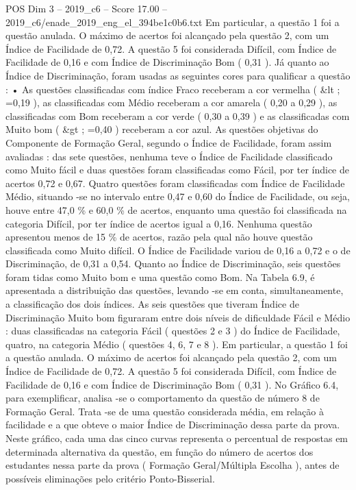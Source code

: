 \begin{textsample}{POS Dim 3 – 2019\_c6 – Score 17.00 – 2019\_c6/enade\_2019\_eng\_el\_394be1c0b6.txt}
Em particular, a questão 1 foi a questão anulada.
O máximo de acertos foi alcançado pela questão 2, com um Índice de Facilidade de 0,72.
A questão 5 foi considerada Difícil, com Índice de Facilidade de 0,16 e com Índice de Discriminação Bom ( 0,31 ).
Já quanto ao Índice de Discriminação, foram usadas as seguintes cores para qualificar a questão : • As questões classificadas com índice Fraco receberam a cor vermelha ( \&lt ; =0,19 ), as classificadas com Médio receberam a cor amarela ( 0,20 a 0,29 ), as classificadas com Bom receberam a cor verde ( 0,30 a 0,39 ) e as classificadas com Muito bom ( \&gt ; =0,40 ) receberam a cor azul.
As questões objetivas do Componente de Formação Geral, segundo o Índice de Facilidade, foram assim avaliadas : das sete questões, nenhuma teve o Índice de Facilidade classificado como Muito fácil e duas questões foram classificadas como Fácil, por ter índice de acertos 0,72 e 0,67.
Quatro questões foram classificadas com Índice de Facilidade Médio, situando -se no intervalo entre 0,47 e 0,60 do Índice de Facilidade, ou seja, houve entre 47,0 \% e 60,0 \% de acertos, enquanto uma questão foi classificada na categoria Difícil, por ter índice de acertos igual a 0,16.
Nenhuma questão apresentou menos de 15 \% de acertos, razão pela qual não houve questão classificada como Muito difícil.
O Índice de Facilidade variou de 0,16 a 0,72 e o de Discriminação, de 0,31 a 0,54.
Quanto ao Índice de Discriminação, seis questões foram tidas como Muito bom e uma questão como Bom.
Na Tabela 6.9, é apresentada a distribuição das questões, levando -se em conta, simultaneamente, a classificação dos dois índices.
As seis questões que tiveram Índice de Discriminação Muito bom figuraram entre dois níveis de dificuldade Fácil e Médio : duas classificadas na categoria Fácil ( questões 2 e 3 ) do Índice de Facilidade, quatro, na categoria Médio ( questões 4, 6, 7 e 8 ).
Em particular, a questão 1 foi a questão anulada.
O máximo de acertos foi alcançado pela questão 2, com um Índice de Facilidade de 0,72.
A questão 5 foi considerada Difícil, com Índice de Facilidade de 0,16 e com Índice de Discriminação Bom ( 0,31 ).
No Gráfico 6.4, para exemplificar, analisa -se o comportamento da questão de número 8 de Formação Geral.
Trata -se de uma questão considerada média, em relação à facilidade e a que obteve o maior Índice de Discriminação dessa parte da prova.
Neste gráfico, cada uma das cinco curvas representa o percentual de respostas em determinada alternativa da questão, em função do número de acertos dos estudantes nessa parte da prova ( Formação Geral/Múltipla Escolha ), antes de possíveis eliminações pelo critério Ponto-Bisserial.

\end{textsample}
